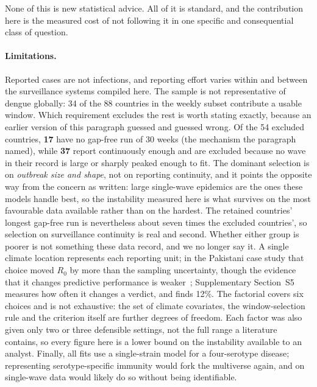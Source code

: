 \documentclass[11pt,a4paper]{article}
\begin{document}
None of this is new statistical advice. All of it is standard, and the
contribution here is the measured cost of not following it in one specific and
consequential class of question.

\paragraph{Limitations.}
\label{sec:limits}
Reported cases are not infections, and reporting effort varies within and between
the surveillance systems compiled here. The sample is not representative of dengue
globally: 34 of the 88 countries in the weekly subset contribute a usable window.
Which requirement excludes the rest is worth stating exactly, because an earlier
version of this paragraph guessed and guessed wrong. Of the 54 excluded countries,
\textbf{17} have no gap-free run of 30 weeks (the mechanism the paragraph named), while \textbf{37} report continuously enough and are excluded because no wave
in their record is large or sharply peaked enough to fit. The dominant selection
is on \emph{outbreak size and shape}, not on reporting continuity, and it points
the opposite way from the concern as written: large single-wave epidemics are the
ones these models handle best, so the instability measured here is what survives
on the most favourable data available rather than on the hardest. The retained
countries' longest gap-free run is nevertheless about seven times the excluded
countries', so selection on surveillance continuity is real and second. Whether
either group is poorer is not something these data record, and we no longer say
it. A single climate location represents each reporting unit; in the
Pakistani case study that choice moved $R_0$ by more than the sampling
uncertainty, though the evidence that it changes predictive performance is
weaker~\cite{spatial2026}; Supplementary Section~S5 measures how often it changes
a verdict, and finds 12\%. The factorial covers six choices and is not exhaustive: the
set of climate covariates, the window-selection rule and the criterion itself are
further degrees of freedom. Each factor was also given only two or three
defensible settings, not the full range a literature contains, so every figure
here is a lower bound on the instability available to an analyst. Finally, all
fits use a single-strain model for a four-serotype disease; representing
serotype-specific immunity would fork the multiverse again, and on single-wave
data would likely do so without being identifiable.

\end{document}
